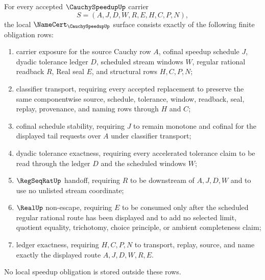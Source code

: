 \begin{theorem}
\label{thm:cauchy-speedup-namecert-obligations}
For every accepted $\CauchySpeedupUp$ carrier
$$
S=(A,J,D,W,R,E,H,C,P,N),
$$
the local $\NameCert_{\CauchySpeedupUp}$ surface consists exactly of the following finite obligation rows:
\begin{enumerate}
\item carrier exposure for the source Cauchy row $A$, cofinal speedup schedule $J$, dyadic tolerance ledger $D$, scheduled stream windows $W$, regular rational readback $R$, Real seal $E$, and structural rows $H,C,P,N$;
\item classifier transport, requiring every accepted replacement to preserve the same componentwise source, schedule, tolerance, window, readback, seal, replay, provenance, and naming rows through $H$ and $C$;
\item cofinal schedule stability, requiring $J$ to remain monotone and cofinal for the displayed tail requests over $A$ under classifier transport;
\item dyadic tolerance exactness, requiring every accelerated tolerance claim to be read through the ledger $D$ and the scheduled windows $W$;
\item $\RegSeqRatUp$ handoff, requiring $R$ to be downstream of $A,J,D,W$ and to use no unlisted stream coordinate;
\item $\RealUp$ non-escape, requiring $E$ to be consumed only after the scheduled regular rational route has been displayed and to add no selected limit, quotient equality, trichotomy, choice principle, or ambient completeness claim;
\item ledger exactness, requiring $H,C,P,N$ to transport, replay, source, and name exactly the displayed route $A,J,D,W,R,E$.
\end{enumerate}
No local speedup obligation is stored outside these rows.
\end{theorem}

